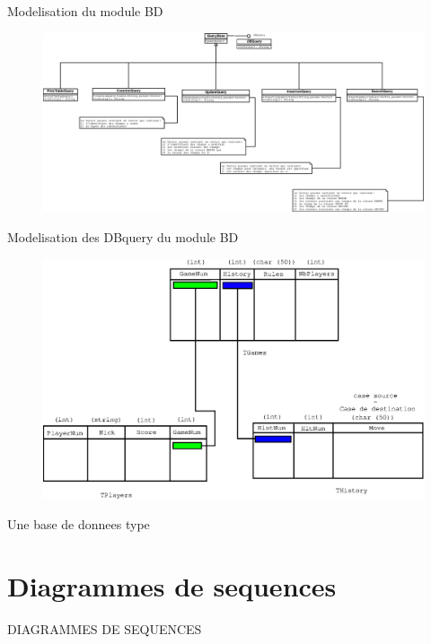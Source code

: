 \documentclass[french,12pt]{report}
\begin{document}
\begin{center}
Modelisation du module BD

\pagebreak

\begin{figure}[h]
\includegraphics[width=16cm, angle=90]{BDserveurQuery.eps}
\end{figure}

Modelisation des DBquery du module BD

\pagebreak

\begin{figure}[h]
\includegraphics[width=16cm]{BD.eps}
\end{figure}

Une base de donnees type

\end{center}

\pagebreak

\section*{Diagrammes de sequences}
{\uppercase{Diagrammes de sequences}}
\end{document}
